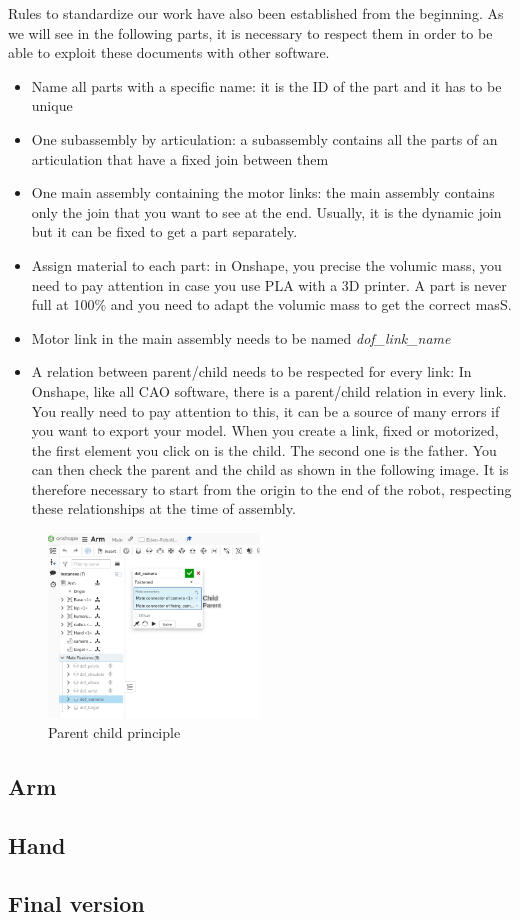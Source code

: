 Rules to standardize our work have also been established from the beginning. As we will see in the following parts, it is necessary to respect them in order to be able to exploit these documents with other software.
\begin{itemize}
    \item Name all parts with a specific name: it is the ID of the part and it has to be unique
    \item One subassembly by articulation: a subassembly contains all the parts of an articulation that have a fixed join between them
    \item One main assembly containing the motor links: the main assembly contains only the join that you want to see at the end. Usually, it is the dynamic join but it can be fixed to get a part separately.
    \item Assign material to each part: in Onshape, you precise the volumic mass, you need to pay attention in case you use PLA with a 3D printer. A part is never full at 100\% and you need to adapt the volumic mass to get the correct masS.
    \item Motor link in the main assembly needs to be named \textit{dof\_\less link\_name\bg}
    \item A relation between parent/child needs to be respected for every link: In Onshape, like all CAO software, there is a parent/child relation in every link. You really need to pay attention to this, it can be a source of many errors if you want to export your model. When you create a link, fixed or motorized, the first element you click on is the child. The second one is the father. You can then check the parent and the child as shown in the following image. It is therefore necessary to start from the origin to the end of the robot, respecting these relationships at the time of assembly.
\end{itemize}
\begin{figure}[H]
    \centering
    \includegraphics[width=0.5\textwidth]{Images/Section03/Parent_Child.png}
    \caption{Parent child principle}
    \label{fig:ParentChild}
\end{figure}

\subsection{Arm}

\subsection{Hand}

\subsection{Final version}